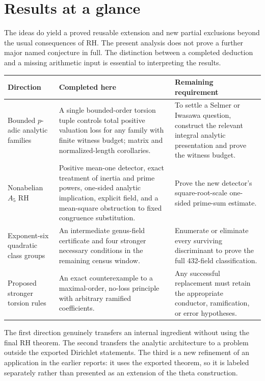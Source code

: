 \documentclass[11pt,a4paper]{article}
\theoremstyle{definition}
\theoremstyle{remark}
\numberwithin{equation}{section}
\begin{document}
\section*{Results at a glance}
The ideas do yield a proved reusable extension and new partial exclusions
beyond the usual consequences of RH. The present analysis does not prove
a further major named conjecture in full. The distinction between a
completed deduction and a missing arithmetic input is essential to
interpreting the results.

\begin{center}
\small
\begin{tabularx}{\textwidth}{@{}>{\raggedright\arraybackslash}p{31mm}YY@{}}
\toprule
Direction & Completed here & Remaining requirement\\
\midrule
Bounded \(p\)-adic analytic families &
A single bounded-order torsion tuple controls total positive valuation
loss for any family with finite witness budget; matrix and normalized-length
corollaries. &
To settle a Selmer or Iwasawa question, construct the relevant integral
analytic presentation and prove the witness budget.\\
\addlinespace
Nonabelian \(A_5\) RH &
Positive mean-one detector, exact treatment of inertia and prime powers,
one-sided analytic implication, explicit field, and a mean-square
obstruction to fixed congruence substitution. &
Prove the new detector's square-root-scale one-sided prime-sum estimate.\\
\addlinespace
Exponent-six quadratic class groups &
An intermediate genus-field certificate and four stronger necessary
conditions in the remaining census window. &
Enumerate or eliminate every surviving discriminant to prove the full
432-field classification.\\
\addlinespace
Proposed stronger torsion rules &
An exact counterexample to a maximal-order, no-loss principle with
arbitrary ramified coefficients. &
Any successful replacement must retain the appropriate conductor,
ramification, or error hypotheses.\\
\bottomrule
\end{tabularx}
\end{center}

The first direction genuinely transfers an internal ingredient without
using the final RH theorem. The second transfers the analytic architecture
to a problem outside the exported Dirichlet statements. The third is a
new refinement of an application in the earlier reports: it uses the
exported theorem, so it is labeled separately rather than presented as
an extension of the theta construction.
\end{document}

